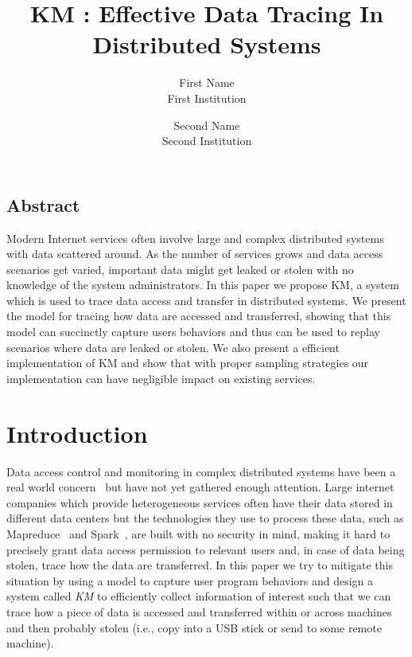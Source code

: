 \documentclass[letterpaper,twocolumn,10pt]{article}
\begin{document}
\date{}

\title{\Large \bf KM : Effective Data Tracing In Distributed Systems}

\author{
{\rm First Name}\\
First Institution\\
\and
{\rm Second Name}\\
Second Institution
} %

\maketitle

\thispagestyle{empty}


\subsection*{Abstract}
Modern Internet services often involve large and complex distributed systems
with data scattered around. As the number of services grows and data access
scenarios get varied, important data might get leaked or stolen with no
knowledge of the system administrators. In this paper we propose KM, a system
which is used to trace data access and transfer in distributed systems. We
present the model for tracing how data are accessed and transferred, showing
that this model can succinctly capture users behaviors and thus can be used
to replay scenarios where data are leaked or stolen. We also present a
efficient implementation of KM and show that with proper sampling strategies
our implementation can have negligible impact on existing services. 

\section{Introduction}
Data access control and monitoring in complex distributed systems have been a
real world concern~\cite{cloudComputing:2010} but have not yet gathered enough
attention. Large internet companies which provide heterogeneous services
often have their data stored in different data centers but the technologies
they use to process these data, such as Mapreduce~\cite{MapReduce:2008} and
Spark~\cite{Spark:2015}, are built with no security in mind, making it hard to
precisely grant data access permission to relevant users and, in case of data
being stolen, trace how the data are transferred. In this paper we try to
mitigate this situation by using a model to capture user program behaviors
and design a system called \textit{KM} to efficiently collect information of
interest such that we can trace how a piece of data is accessed and
transferred within or across machines and then probably stolen (i.e., copy
into a USB stick or send to some remote machine). 
\end{document}
